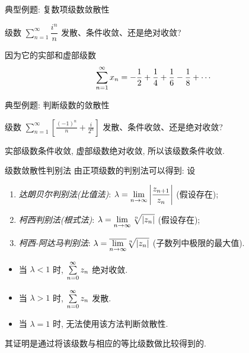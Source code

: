 \begin{frame}{典型例题: 复数项级数敛散性}
	\onslide<+->
	\begin{example}
		级数 $\displaystyle\sum_{n=1}^\infty\dfrac{i^n}n$ 发散、条件收敛、还是绝对收敛?
	\end{example}

	\onslide<+->
	\begin{solution}
		因为它的实部和虚部级数
		\[\sum_{n=1}^\infty x_n=-\frac{1}{2} +\frac14+\frac16-\frac18+\cdots\]
	\onslide<+->{所以原级数条件收敛.}
	\end{solution}
\end{frame}


\begin{frame}{典型例题: 判断级数的敛散性}
	\onslide<+->
	\begin{exercise}
		级数 $\displaystyle\sum_{n=1}^\infty\left[\frac{(-1)^n}n+\frac i{2^n}\right]$ 发散、条件收敛、还是绝对收敛?
	\end{exercise}

	\onslide<+->
	\begin{answer}
		实部级数条件收敛, 虚部级数绝对收敛, 所以该级数条件收敛.
	\end{answer}
\end{frame}


\begin{frame}{级数敛散性判别法}
	由正项级数的判别法可以得到:
	\onslide<+->
	设
	\begin{enumerate}
		\item \emph{达朗贝尔判别法(比值法)}: $\lambda=\displaystyle\lim_{n\to\infty}\left|\frac{z_{n+1}}{z_n}\right|$ (假设存在);
		\item \emph{柯西判别法(根式法)}: $\lambda=\displaystyle\lim_{n\to\infty}\sqrt[n]{\left|z_n\right|}$ (假设存在);
		\item \emph{柯西-阿达马判别法}: $\lambda=\displaystyle\overline{\lim_{n\to\infty}}\sqrt[n]{\left|z_n\right|}$ (子数列中极限的最大值).
	\end{enumerate}

	\begin{itemize}
		\item 当 $\lambda<1$ 时, $\sum\limits_{n=0}^\infty z_n$ 绝对收敛.
		\item 当 $\lambda>1$ 时, $\sum\limits_{n=0}^\infty z_n$ 发散.
		\item 当 $\lambda=1$ 时, 无法使用该方法判断敛散性.
	\end{itemize}
	\onslide<+->
	其证明是通过将该级数与相应的等比级数做比较得到的.
\end{frame}


